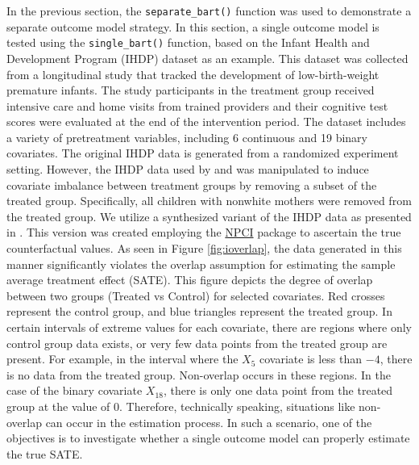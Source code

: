 In the previous section, the \verb|separate_bart()| function was used to demonstrate a separate outcome model strategy. In this section, a single outcome model is tested using the \verb|single_bart()| function, based on the Infant Health and Development Program (IHDP) dataset as an example. This dataset was collected from a longitudinal study that tracked the development of low-birth-weight premature infants. The study participants in the treatment group received intensive care and home visits from trained providers and their cognitive test scores were evaluated at the end of the intervention period. The dataset includes a variety of pretreatment variables, including 6 continuous and 19 binary covariates. The original IHDP data is generated from a randomized experiment setting. However, the IHDP data used by \cite{bartcause} and \cite{louizos:2017} was manipulated to induce covariate imbalance between treatment groups by removing a subset of the treated group. Specifically, all children with nonwhite mothers were removed from the treated group. We utilize a synthesized variant of the IHDP data as presented in \cite{louizos:2017}. This version was created employing the \href{https://github.com/vdorie/npci}{NPCI} package \citep{npci} to ascertain the true counterfactual values. As seen in Figure \ref{fig:ioverlap}, the data generated in this manner significantly violates the overlap assumption for estimating the sample average treatment effect (SATE). This figure depicts the degree of overlap between two groups (Treated vs Control) for selected covariates. Red crosses represent the control group, and blue triangles represent the treated group. In certain intervals of extreme values for each covariate, there are regions where only control group data exists, or very few data points from the treated group are present. For example, in the interval where the $X_5$ covariate is less than $-4$, there is no data from the treated group. Non-overlap occurs in these regions. In the case of the binary covariate $X_{18}$, there is only one data point from the treated group at the value of 0. Therefore, technically speaking, situations like non-overlap can occur in the estimation process.
In such a scenario, one of the objectives is to investigate whether a single outcome model can properly estimate the true SATE.


